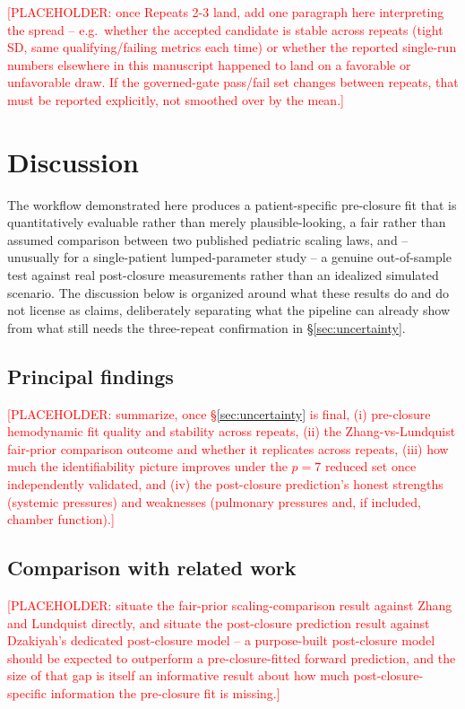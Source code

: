\documentclass{article}
\begin{document}
\textcolor{red}{[PLACEHOLDER: once Repeats 2-3 land, add one paragraph
here interpreting the spread -- e.g.\ whether the accepted candidate is
stable across repeats (tight SD, same qualifying/failing metrics each
time) or whether the reported single-run numbers elsewhere in this
manuscript happened to land on a favorable or unfavorable draw. If the
governed-gate pass/fail set changes between repeats, that must be reported
explicitly, not smoothed over by the mean.]}

\section{Discussion}
\label{sec:discussion}

The workflow demonstrated here produces a patient-specific pre-closure fit that is quantitatively evaluable rather than merely plausible-looking, a fair rather than assumed comparison between two published pediatric scaling laws, and -- unusually for a single-patient lumped-parameter study -- a genuine out-of-sample test against real post-closure measurements rather than an idealized simulated scenario. The discussion below is organized around what these results do and do not license as claims, deliberately separating what the pipeline can already show from what still needs the three-repeat confirmation in \S\ref{sec:uncertainty}.

\subsection{Principal findings}
\textcolor{red}{[PLACEHOLDER: summarize, once \S\ref{sec:uncertainty} is
final, (i) pre-closure hemodynamic fit quality and stability across
repeats, (ii) the Zhang-vs-Lundquist fair-prior comparison outcome and
whether it replicates across repeats, (iii) how much the identifiability
picture improves under the $p{=}7$ reduced set once independently
validated, and (iv) the post-closure prediction's honest strengths
(systemic pressures) and weaknesses (pulmonary pressures and, if included,
chamber function).]}

\subsection{Comparison with related work}
\textcolor{red}{[PLACEHOLDER: situate the fair-prior scaling-comparison
result against Zhang \cite{zhang2019multiscale} and Lundquist
\cite{Lundquist2025} directly, and situate the post-closure prediction
result against Dzakiyah's dedicated post-closure model
\cite{Dzakiyah2026Thesis} -- a purpose-built post-closure model should be
expected to outperform a pre-closure-fitted forward prediction, and the
size of that gap is itself an informative result about how much
post-closure-specific information the pre-closure fit is missing.]}
\end{document}
